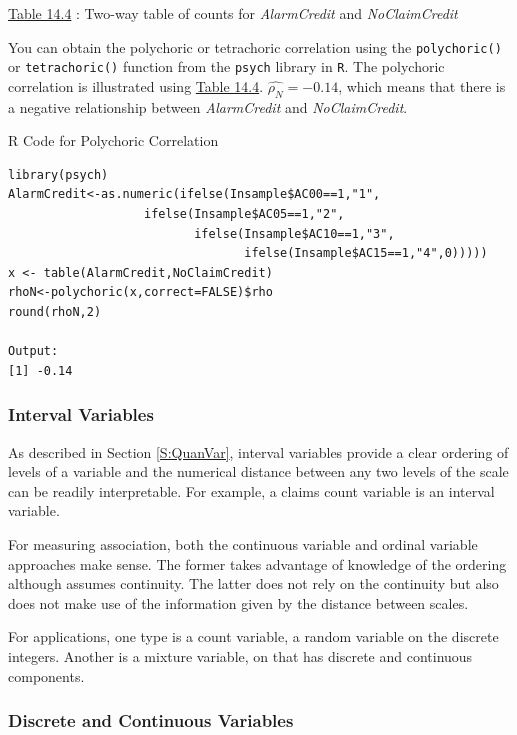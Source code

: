 \documentclass[]{book}
\theoremstyle{definition}
\theoremstyle{definition}
\theoremstyle{definition}
\theoremstyle{remark}
\begin{document}
\protect\hyperlink{tab:14.4}{Table 14.4} : Two-way table of counts for
\emph{AlarmCredit} and \emph{NoClaimCredit}

You can obtain the polychoric or tetrachoric correlation using the
\texttt{polychoric()} or \texttt{tetrachoric()} function from the
\texttt{psych} library in \texttt{R}. The polychoric correlation is
illustrated using \protect\hyperlink{tab:14.4}{Table 14.4}.
\(\hat{\rho_N}=-0.14\), which means that there is a negative
relationship between \emph{AlarmCredit} and \emph{NoClaimCredit}.

R Code for Polychoric Correlation

\hypertarget{display.poly.2}{}
\begin{verbatim}
library(psych)
AlarmCredit<-as.numeric(ifelse(Insample$AC00==1,"1",
                   ifelse(Insample$AC05==1,"2",
                          ifelse(Insample$AC10==1,"3",
                                 ifelse(Insample$AC15==1,"4",0)))))
x <- table(AlarmCredit,NoClaimCredit)
rhoN<-polychoric(x,correct=FALSE)$rho
round(rhoN,2)

Output:
[1] -0.14
\end{verbatim}

\subsubsection{Interval Variables}\label{interval-variables}

As described in Section \ref{S:QuanVar}, interval variables provide a
clear ordering of levels of a variable and the numerical distance
between any two levels of the scale can be readily interpretable. For
example, a claims count variable is an interval variable.

For measuring association, both the continuous variable and ordinal
variable approaches make sense. The former takes advantage of knowledge
of the ordering although assumes continuity. The latter does not rely on
the continuity but also does not make use of the information given by
the distance between scales.

For applications, one type is a count variable, a random variable on the
discrete integers. Another is a mixture variable, on that has discrete
and continuous components.

\subsubsection{Discrete and Continuous
Variables}\label{discrete-and-continuous-variables}
\end{document}
